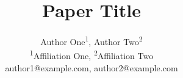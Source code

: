 \documentclass[letterpaper]{article}
\begin{document}
\title{Paper Title}
\author{
  Author One\textsuperscript{1},
  Author Two\textsuperscript{2} \\
  \textsuperscript{1}Affiliation One,
  \textsuperscript{2}Affiliation Two \\
  author1@example.com, author2@example.com
}

\maketitle











\end{document}
